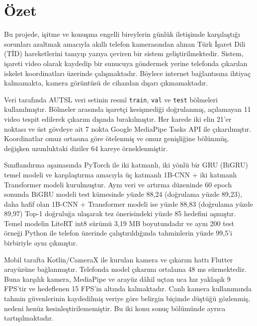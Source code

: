 \clearpage
\section{Özet}
\label{CH:BolumOzet}

Bu projede, işitme ve konuşma engelli bireylerin günlük iletişimde karşılaştığı
sorunları azaltmak amacıyla akıllı telefon kamerasından alınan Türk İşaret Dili
(TİD) hareketlerini tanıyıp yazıya çeviren bir sistem geliştirilmektedir. Sistem,
işareti video olarak kaydedip bir sunucuya göndermek yerine telefonda çıkarılan
iskelet koordinatları üzerinde çalışmaktadır. Böylece internet bağlantısına ihtiyaç
kalmamakta, kamera görüntüsü de cihazdan dışarı çıkmamaktadır.

Veri tarafında AUTSL veri setinin resmî \texttt{train}, \texttt{val} ve
\texttt{test} bölmeleri kullanılmıştır. Bölmeler arasında işaretçi kesişmediği
doğrulanmış, açılamayan 11 video tespit edilerek çıkarım dışında bırakılmıştır.
Her karede iki elin 21'er noktası ve üst gövdeye ait 7 nokta Google MediaPipe
Tasks API ile çıkarılmıştır. Koordinatlar omuz ortasına göre ötelenmiş ve omuz
genişliğine bölünmüş, değişken uzunluktaki diziler 64 kareye örneklenmiştir.

Sınıflandırma aşamasında PyTorch ile iki katmanlı, iki yönlü bir GRU (BiGRU)
temel modeli ve karşılaştırma amacıyla üç katmanlı 1B-CNN + iki katmanlı
Transformer modeli kurulmuştur. Aynı veri ve artırma düzeninde 60 epoch sonunda
BiGRU modeli test kümesinde yüzde 88,24 (doğrulama yüzde 89,23), daha hafif olan
1B-CNN + Transformer modeli ise yüzde 88,83 (doğrulama yüzde 89,97) Top-1
doğruluğa ulaşarak tez önerisindeki yüzde 85 hedefini aşmıştır. Temel modelin
LiteRT int8 sürümü 3,19 MB boyutundadır ve aynı 200 test örneği Python ile
telefon üzerinde çalıştırıldığında tahminlerin yüzde 99,5'i birbiriyle aynı
çıkmıştır.

Mobil tarafta Kotlin/CameraX ile kurulan kamera ve çıkarım hattı Flutter
arayüzüne bağlanmıştır. Telefonda model çıkarımı ortalama 48 ms sürmektedir.
Buna karşılık kamera, MediaPipe ve arayüz dâhil uçtan uca hız yaklaşık 9 FPS'tir
ve hedeflenen 15 FPS'in altında kalmaktadır. Canlı kamera kullanımında tahmin
güvenlerinin kaydedilmiş veriye göre belirgin biçimde düştüğü gözlenmiş, nedeni
henüz kesinleştirilememiştir. Bu iki konu sonuç bölümünde ayrıca tartışılmaktadır.

\clearpage
